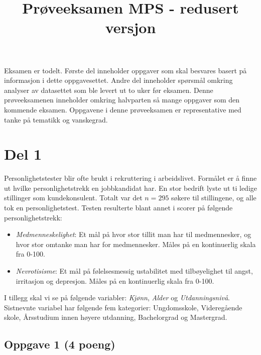 \documentclass[12pt,a4paper, norsk]{article}
\title{Prøveeksamen MPS - redusert versjon}
\date{\nodate}
\begin{document}
 	
 	Eksamen er todelt. Første del inneholder oppgaver som skal besvares basert på informasjon i dette oppgavesettet. 
 	Andre del inneholder spørsmål omkring analyser av datasettet som ble levert ut to uker før eksamen. 
 	Denne prøveeksamenen inneholder omkring halvparten så mange oppgaver som den kommende eksamen. 
 	Oppgavene i denne prøveeksamen er representative med tanke på tematikk og vanskegrad. 
 	
 \section*{Del 1}
 
Personlighetstester blir ofte brukt i rekruttering i arbeidslivet. 
Formålet er å finne ut hvilke personlighetstrekk en jobbkandidat har.  En stor bedrift lyste ut ti ledige stillinger som kundekonsulent. Totalt var det $n=295$ søkere til stillingene, og alle tok en personlighetstest. 
Testen resulterte blant annet i scorer på følgende personlighetstrekk:
\begin{itemize}
	\item {\it Medmenneskelighet}: Et mål på hvor stor tillit man har til medmennesker, og hvor stor omtanke man har for medmennesker.  Måles på en kontinuerlig skala fra 0-100.
	
	\item {\it Nevrotisisme}:  Et mål på følelsesmessig ustabilitet med tilbøyelighet til angst, irritasjon og depresjon. Måles på en kontinuerlig skala fra 0-100.
	
\end{itemize}

I tillegg skal vi se på følgende variabler: {\it Kjønn}, {\it Alder} og {\it Utdanningsnivå}.  Sistnevnte variabel har følgende fem kategorier: Ungdomsskole, Videregående skole, Årsstudium innen høyere utdanning, Bachelorgrad og Mastergrad. 

 


\subsection*{Oppgave 1  (4 poeng) }
\end{document}
